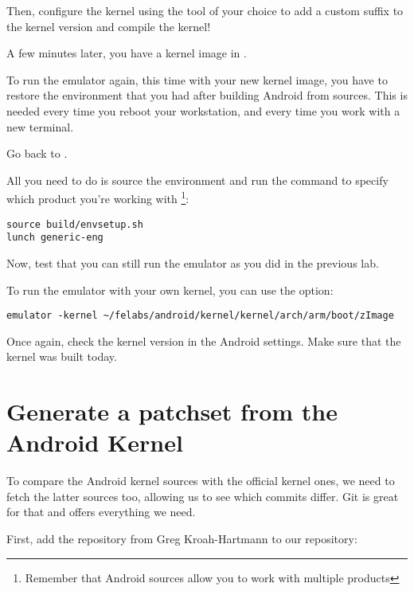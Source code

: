 
Then, configure the kernel using the tool of your choice to add a custom suffix
to the kernel version and compile the kernel!


A few minutes later, you have a kernel image in .


To run the emulator again, this time with your new kernel image, you
have to restore the environment that you had after building Android from
sources. This is needed every time you reboot your workstation, and every time
you work with a new terminal.

Go back to .

All you need to do is source the environment and run the 
command to specify which product you're working with
\footnote{Remember that Android sources allow you to work with
multiple products}:

\begin{verbatim}
source build/envsetup.sh
lunch generic-eng
\end{verbatim}

Now, test that you can still run the emulator as you did in the
previous lab.

To run the emulator with your own kernel, you can use the 
option:

\begin{verbatim}
emulator -kernel ~/felabs/android/kernel/kernel/arch/arm/boot/zImage
\end{verbatim}

Once again, check the kernel version in the Android settings. Make sure
that the kernel was built today.

\section{Generate a patchset from the Android Kernel}

To compare the Android kernel sources with the official kernel ones,
we need to fetch the latter sources too, allowing us to see which 
commits differ. Git is great for that and offers everything we need.

First, add the  repository from Greg Kroah-Hartmann to our
repository:


